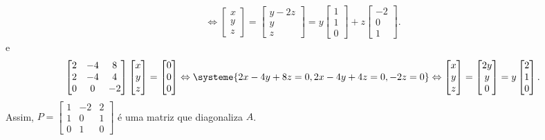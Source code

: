 \documentclass[12pt,a4paper]{article}
\begin{document}
\begin{ExerciseList}
\begin{enumerate}
\begin{align*}
\Leftrightarrow
\begin{bmatrix}
x\\
y\\
z
\end{bmatrix}
=
\begin{bmatrix}
y-2z\\
y\\
z
\end{bmatrix}
=
y
\begin{bmatrix}
1\\
1\\
0
\end{bmatrix}
+z
\begin{bmatrix}
-2\\
 0\\
 1
\end{bmatrix}.
\end{align*}
e
\begin{align*}
\begin{bmatrix}
2 & -4 &  8\\
2 & -4 &  4\\
0 &  0 & -2
\end{bmatrix}
\begin{bmatrix}
x\\
y\\
z
\end{bmatrix}
=
\begin{bmatrix}
0\\
0\\
0
\end{bmatrix}
\Leftrightarrow
\systeme{
2x-4y+8z=0,
2x-4y+4z=0,
     -2z=0
}
\Leftrightarrow
\begin{bmatrix}
x\\
y\\
z
\end{bmatrix}
=
\begin{bmatrix}
2y\\
y\\
0
\end{bmatrix}
=
y
\begin{bmatrix}
2\\
1\\
0
\end{bmatrix}.
\end{align*}
Assim, $P =
\begin{bmatrix}
1 & -2 & 2\\
1 &  0 & 1\\
0 &  1 & 0
\end{bmatrix}$ é uma matriz que diagonaliza $A$.


\end{enumerate}
\end{ExerciseList}
\end{document}
